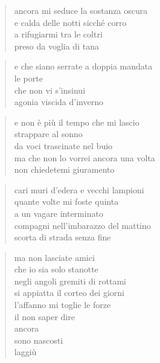 \clearpage


\begin{verse}
    ancora mi seduce la sostanza oscura\\
    e calda delle notti sicché corro\\
    a rifugiarmi tra le coltri\\
    preso da voglia di tana
\end{verse}

\begin{verse}
    e che siano serrate a doppia mandata\\
    le porte\\
    che non vi s'insinui\\
    agonia viscida d'inverno
\end{verse}

\begin{verse}
    e non è più il tempo che mi lascio\\
    strappare al sonno\\
    da voci trascinate nel buio\\
    ma che non lo vorrei ancora una volta\\
    non chiedetemi giuramento
\end{verse}

\clearpage


\begin{verse}
    cari muri d’edera e vecchi lampioni\\
    quante volte mi foste quinta\\
    a un vagare interminato\\
    compagni nell’imbarazzo del mattino\\
    scorta di strada senza fine
\end{verse}

\begin{verse}
    ma non lasciate amici\\
    che io sia solo stanotte\\
    negli angoli gremiti di rottami\\
    si appiatta il corteo dei giorni\\
    l’affanno mi toglie le forze\\
    il non saper dire\\
    ancora\\
    sono nascosti\\
    laggiù
\end{verse}

